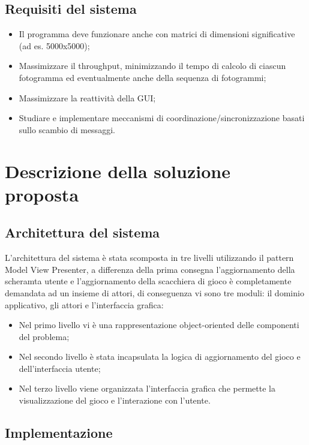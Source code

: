 \documentclass[a4paper]{article}
\begin{document}
\subsection{Requisiti del sistema}\label{requisiti-del-sistema}

\begin{itemize}
\item
  Il programma deve funzionare anche con matrici di dimensioni significative (ad es. 5000x5000);
\item
  Massimizzare il throughput, minimizzando il tempo di calcolo di ciascun fotogramma ed eventualmente anche della sequenza di fotogrammi;
\item
  Massimizzare la reattività della GUI;
\item
  Studiare e implementare meccanismi di coordinazione/sincronizzazione basati sullo scambio di messaggi.
\end{itemize}

\section{Descrizione della soluzione proposta}\label{descrizione-della-soluzione-proposta}

\subsection{Architettura del sistema}\label{architettura-del-sistema}

L'architettura del sistema è stata scomposta in tre livelli utilizzando il pattern Model View Presenter, a differenza della prima consegna l'aggiornamento della scheramta utente e l'aggiornamento della scacchiera di gioco è completamente demandata ad un insieme di attori, di conseguenza vi sono tre moduli: il dominio applicativo, gli attori e l'interfaccia grafica:

\begin{itemize}
\item
  Nel primo livello vi è una rappresentazione object-oriented delle componenti del problema;
\item
  Nel secondo livello è stata incapsulata la logica di aggiornamento del gioco e dell'interfaccia utente;
\item
  Nel terzo livello viene organizzata l'interfaccia grafica che permette la visualizzazione del gioco e l'interazione con l'utente.
\end{itemize}

\subsection{Implementazione}\label{implementazione}
\end{document}
